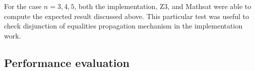 For the case $n = 3, 4, 5$, both the implementation, Z3, and Mathsat were able
to compute the expected result discussed above. This particular test
was useful to check disjunction of equalities propagation mechanism in the
implementation work.

\subsection{Performance evaluation} \label{performance_thcomb}




%



